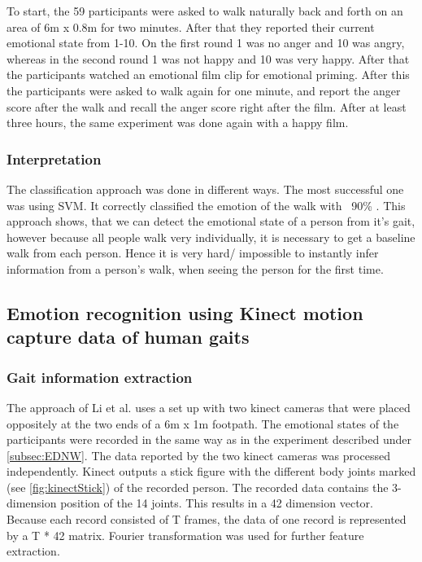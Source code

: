 \documentclass[conference]{IEEEtran}
\begin{document}
To start, the 59 participants were asked to walk naturally back and forth on an area of 6m x 0.8m for two minutes\cite{cui2016emotion}. After that they reported their current emotional state from 1-10\cite{cui2016emotion}. On the first round 1 was no anger and 10 was angry, whereas in the second round 1 was not happy and 10 was very happy.  After that the participants watched an emotional film clip for emotional priming\cite{cui2016emotion}. After this the participants were asked to walk again for one minute, and report the anger score after the walk and recall the anger score right after the film\cite{cui2016emotion}.  After at least three hours, the same experiment was done again with a happy film. 
\subsubsection{Interpretation}
The classification approach was done in different ways. The most successful one was using SVM. It correctly classified the emotion of the walk with ~90\% \cite{cui2016emotion}. 
This approach shows, that we can detect the emotional state of a person from it's gait, however because all people walk very individually, it is necessary to get a baseline walk from each person. Hence it is very hard/ impossible to instantly infer information from a person's walk, when seeing the person for the first time.

\subsection{Emotion recognition using Kinect motion capture data of human gaits}
\label{subsec:LiGait}
\subsubsection{Gait information extraction}
The approach of Li et al.\cite{li2016emotion} uses a set up with two kinect cameras that were placed oppositely at the two ends of a 6m x 1m footpath. The emotional states of the participants were recorded in the same way as in the experiment described under \autoref{subsec:EDNW}. The data reported by the two kinect cameras was processed independently\cite{li2016emotion}. Kinect outputs a stick figure with the different body joints marked (see \autoref{fig:kinectStick}) of the recorded person. The recorded data contains the 3-dimension position of the 14 joints\cite{li2016emotion}. This results in a 42 dimension vector. Because each record consisted of T frames, the data of one record is represented by a T * 42 matrix\cite{li2016emotion}. Fourier transformation was used for further feature extraction\cite{li2016emotion}. 
\end{document}
